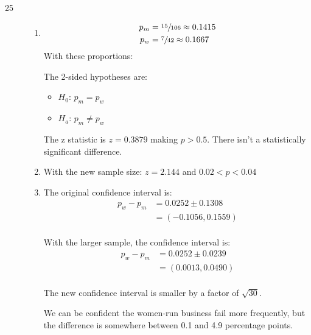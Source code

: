 \documentclass[letterpaper]{exam}
\begin{document}
\begin{description}
      \newpage

      \item[25]
        \begin{enumerate}[label = ({\alph*})]
          \item
            \begin{align*}
              p_m &= \sfrac{15}{106} \approx 0.1415 \\
              p_w &= \sfrac{7}{42} \approx 0.1667 \\
            \end{align*}
            With these proportions:

            The 2-sided hypotheses are:
            \begin{itemize}[label = {}, parsep = 0pt]
              \item $H_0$: $p_m = p_w$
              \item $H_a$: $p_m \ne p_w$
            \end{itemize}

            The z statistic is $z = 0.3879$ making $p > 0.5$. There isn't a
            statistically significant difference.

          \item With the new sample size: $z = 2.144$ and $0.02 < p < 0.04$

          \item 
            The original confidence interval is:
            \begin{align*}
              p_w - p_m & = 0.0252 \pm 0.1308 \\
                        & = (-0.1056, 0.1559) \\
            \end{align*}

            With the larger sample, the confidence interval is:
            \begin{align*}
              p_w - p_m & = 0.0252 \pm 0.0239 \\
                        & = (0.0013, 0.0490) \\
            \end{align*}

            The new confidence interval is smaller by a factor of $\sqrt{30}$. 
            
            We can be confident the women-run business fail more frequently, but the
            difference is somewhere between 0.1 and 4.9 percentage points.

        \end{enumerate}


\end{description}
\end{document}
